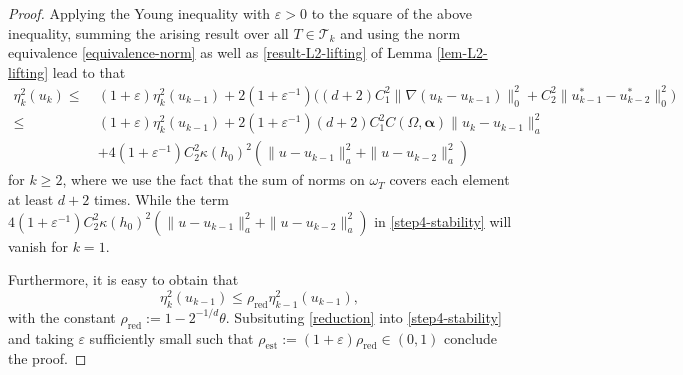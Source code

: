 \documentclass[10pt,a4paper]{amsart}
\newcommand{\Ltw}[1]{\|#1\|_0}
\newcommand{\anorm}[1]{\|#1\|_a}
\newcommand{\est}{\mathrm{est}}
\def\geq{\geqslant}
\def\leq{\leqslant}
\newcommand{\mcT}{\mathcal{T}}
\newcommand{\reduce}{\mathrm{red}}
\newcommand{\valpha}{\boldsymbol{\alpha}}
\newcommand{\veps}{\varepsilon}
\begin{document}
\begin{proof}
Applying the Young inequality with $\veps > 0$ to the square of the above inequality, summing the arising result over all $T \in \mcT_k$ and using the norm equivalence \eqref{equivalence-norm} as well as \eqref{result-L2-lifting} of Lemma \ref{lem-L2-lifting} lead to that 
\begin{align}
	\eta_k^2( u_k) \leq~& (1+\veps)\eta_k^2(u_{k-1})
		+2(1+\veps^{-1})\Big((d+2)C_1^2\Ltw{\nabla(u_k-u_{k-1})}^2 
		+C_2^2\Ltw{u_{k-1}^*-u_{k-2}^*}^2\Big)\nonumber\\
		\leq~&(1+\veps)\eta_k^2(u_{k-1}) + 2(1+\veps^{-1})(d+2)C_1^2C(\Omega,\valpha)
		\anorm{u_k-u_{k-1}}^2 \nonumber\\
		&+4(1+\veps^{-1})C_2^2\kappa(h_0)^2(\anorm{u-u_{k-1}}^2 + \anorm{u-u_{k-2}}^2)
		\label{step4-stability} 
\end{align}
for $k \geq 2$, where we use the fact that the sum of norms on $\omega_T$ covers each element at least $d+2$ times. While the term $4(1+\veps^{-1})C_2^2\kappa(h_0)^2(\anorm{u-u_{k-1}}^2 + \anorm{u-u_{k-2}}^2)$ in \eqref{step4-stability} will vanish for $k=1$. 

 Furthermore, it is easy to obtain that 
 \begin{equation}\label{reduction}
 	\eta_k^2(u_{k-1}) \leq \rho_\reduce\eta_{k-1}^2(u_{k-1}), 
 \end{equation}
 with the constant $\rho_\reduce:= 1 - 2^{-1/d}\theta$. Subsituting \eqref{reduction} into \eqref{step4-stability} and taking $\veps$ sufficiently small such that 
 $\rho_\est := (1+\veps)\rho_\reduce \in (0,1)$ conclude the proof. 
% 
\end{proof}
\end{document}
